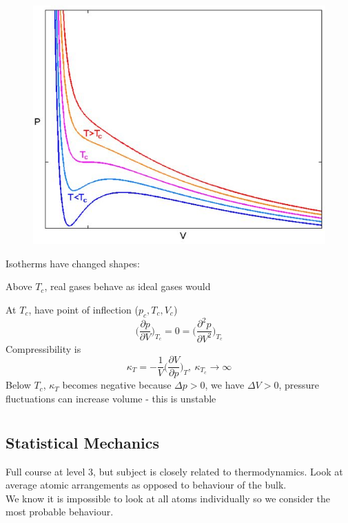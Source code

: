 \documentclass[a4paper, 11pt, normalem]{report}
\newcommand\p{\partial}
\begin{document}
\begin{figure}
    \begin{center}
        \includegraphics[scale=0.3]{IsoReal.png}
    \end{center}
\end{figure}

Isotherms have changed shapes:

Above $T_c$, real gases behave as ideal gases would

At $T_c$, have point of inflection ($p_c, T_c, V_c$)
\begin{equation*}
    \Big(\frac{\p p}{\p V}\Big)_{T_c} = 0 = \Big(\frac{\p^2 p}{\p V^2}\Big)_{T_c}
\end{equation*}
Compressibility is
\begin{equation*}
    \kappa_T = -\frac{1}{V}\Big(\frac{\p V}{\p p}\Big)_T,~ \kappa_{T_c} \to \infty
\end{equation*}
Below $T_c$, $\kappa_T$ becomes negative because $\Delta p > 0$, we have $\Delta V > 0$, pressure fluctuations can increase volume - this is unstable

\chapter{}
\section{Statistical Mechanics}
Full course at level 3, but subject is closely related to thermodynamics. Look at average atomic arrangements as opposed to behaviour of the bulk. \\
We know it is impossible to look at all atoms individually so we consider the most probable behaviour.
\end{document}
